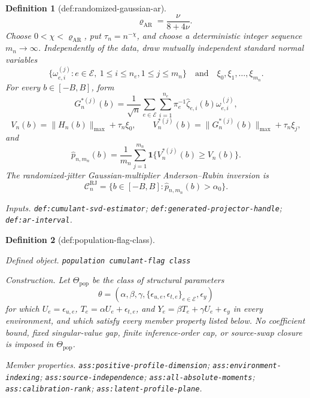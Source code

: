 \documentclass{article}
\newtheorem{definition}{Definition}
\begin{document}
\begin{definition}[def:randomized-gaussian-ar]
\[ \qquad
 \varrho_{\mathrm{AR}}=\frac{\nu}{8+4\nu}.
\]
Choose \(0<\chi<\varrho_{\mathrm{AR}}\), put \(\tau_n=n^{-\chi}\), and choose a deterministic integer sequence \(m_n\to\infty\).  Independently of the data, draw mutually independent standard normal variables
\[
 \{\omega^{(j)}_{e,i}:e\in\mathcal E,\ 1\leq i\leq n_e,
 1\leq j\leq m_n\}
 \quad\text{and}\quad
 \xi_0,\xi_1,\ldots,\xi_{m_n}.
\]
For every \(b\in[-B,B]\), form
\[
 G_n^{*(j)}(b)=\frac1{\sqrt n}
 \sum_{e\in\mathcal E}\sum_{i=1}^{n_e}
 \pi_e^{-1}\widehat\zeta_{e,i}(b)\omega^{(j)}_{e,i},
\]
\[
 V_n(b)=\|H_n(b)\|_{\max}+\tau_n\xi_0,
 \qquad
 V_n^{*(j)}(b)=\|G_n^{*(j)}(b)\|_{\max}+\tau_n\xi_j,
\]
and
\[
 \widehat p_{n,m_n}(b)=\frac1{m_n}\sum_{j=1}^{m_n}
 \mathbf 1\{V_n^{*(j)}(b)\geq V_n(b)\}.
\]
The randomized-jitter Gaussian-multiplier Anderson--Rubin inversion is
\[
 \mathcal C_n^{\mathrm{RJ}}
 =\{b\in[-B,B]:\widehat p_{n,m_n}(b)>\alpha_0\}.
\]
\par\smallskip\noindent\emph{Inputs.} \texttt{def:\allowbreak{}cumulant-\allowbreak{}svd-\allowbreak{}estimator}; \texttt{def:\allowbreak{}generated-\allowbreak{}projector-\allowbreak{}handle}; \texttt{def:\allowbreak{}ar-\allowbreak{}interval}.
\end{definition}

\begin{definition}[def:population-flag-class]\label{def:population-flag-class}
\par\smallskip\noindent\emph{Defined object.} \texttt{population cumulant-\allowbreak{}flag class}
\par\smallskip\noindent\emph{Construction.} Let \(\Theta_{\mathrm{pop}}\) be the class of structural parameters
\[
 \theta=(\alpha,\beta,\gamma,
          \{\epsilon_{u,e},\epsilon_{t,e}\}_{e\in\mathcal E},
          \epsilon_y)
\]
for which \(U_e=\epsilon_{u,e}\), \(T_e=\alpha U_e+\epsilon_{t,e}\), and \(Y_e=\beta T_e+\gamma U_e+\epsilon_y\) in every environment, and which satisfy every member property listed below.  No coefficient bound, fixed singular-value gap, finite inference-order cap, or source-swap closure is imposed in \(\Theta_{\mathrm{pop}}\).
\par\smallskip\noindent\emph{Member properties.} \texttt{ass:\allowbreak{}positive-\allowbreak{}profile-\allowbreak{}dimension}; \texttt{ass:\allowbreak{}environment-\allowbreak{}indexing}; \texttt{ass:\allowbreak{}source-\allowbreak{}independence}; \texttt{ass:\allowbreak{}all-\allowbreak{}absolute-\allowbreak{}moments}; \texttt{ass:\allowbreak{}calibration-\allowbreak{}rank}; \texttt{ass:\allowbreak{}latent-\allowbreak{}profile-\allowbreak{}plane}.
\end{definition}
\end{document}
